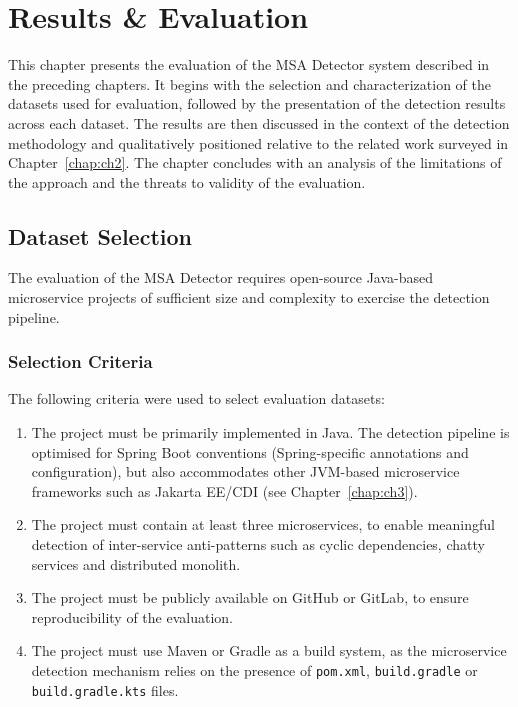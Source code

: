 
\chapter{Results \& Evaluation}
\label{chap:ch5}

\par This chapter presents the evaluation of the MSA Detector system described in the preceding chapters. It begins with the selection and characterization of the datasets used for evaluation, followed by the presentation of the detection results across each dataset. The results are then discussed in the context of the detection methodology and qualitatively positioned relative to the related work surveyed in Chapter~\ref{chap:ch2}. The chapter concludes with an analysis of the limitations of the approach and the threats to validity of the evaluation.

\section{Dataset Selection}
\label{sec:dataset-selection}

\par The evaluation of the MSA Detector requires open-source Java-based microservice projects of sufficient size and complexity to exercise the detection pipeline.

\subsection{Selection Criteria}
\label{subsec:selection-criteria}

\par The following criteria were used to select evaluation datasets:

\begin{enumerate}
    \item The project must be primarily implemented in Java. The detection pipeline is optimised for Spring Boot conventions (Spring-specific annotations and configuration), but also accommodates other JVM-based microservice frameworks such as Jakarta EE/CDI (see Chapter~\ref{chap:ch3}).
    \item The project must contain at least three microservices, to enable meaningful detection of inter-service anti-patterns such as cyclic dependencies, chatty services and distributed monolith.
    \item The project must be publicly available on GitHub or GitLab, to ensure reproducibility of the evaluation.
    \item The project must use Maven or Gradle as a build system, as the microservice detection mechanism relies on the presence of \texttt{pom.xml}, \texttt{build.gradle} or \texttt{build.gradle.kts} files.
\end{enumerate}

